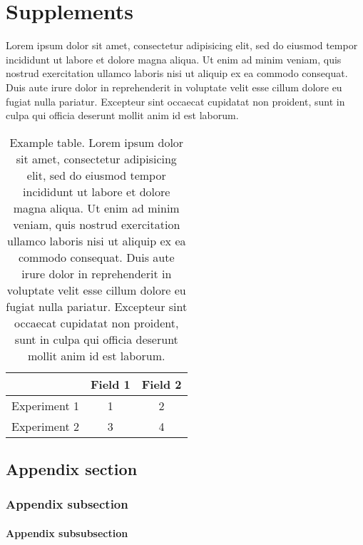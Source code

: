 
\chapter{Supplements}

Lorem ipsum dolor sit amet, consectetur adipisicing elit, sed do eiusmod
tempor incididunt ut labore et dolore magna aliqua. Ut enim ad minim veniam,
quis nostrud exercitation ullamco laboris nisi ut aliquip ex ea commodo
consequat. Duis aute irure dolor in reprehenderit in voluptate velit esse
cillum dolore eu fugiat nulla pariatur. Excepteur sint occaecat cupidatat non
proident, sunt in culpa qui officia deserunt mollit anim id est laborum.

\begin{table}[h]
	\caption[Example table]{Example table. Lorem ipsum dolor sit amet, consectetur adipisicing elit, sed do eiusmod
	tempor incididunt ut labore et dolore magna aliqua. Ut enim ad minim veniam,
	quis nostrud exercitation ullamco laboris nisi ut aliquip ex ea commodo
	consequat. Duis aute irure dolor in reprehenderit in voluptate velit esse
	cillum dolore eu fugiat nulla pariatur. Excepteur sint occaecat cupidatat non
	proident, sunt in culpa qui officia deserunt mollit anim id est laborum.}
	\label{tab:tablename}
	\centering
	\begin{tabular}{lcc}
	\toprule
		& Field 1 & Field 2 \\
	\midrule
	Experiment 1 & 1 & 2 \\
	Experiment 2 & 3 & 4 \\
	\bottomrule
	\end{tabular}
\end{table}

\section{Appendix section}

\subsection{Appendix subsection}

\subsubsection{Appendix subsubsection}